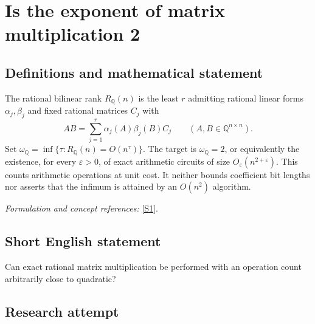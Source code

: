 \documentclass[11pt,a4paper]{article}
\newcommand{\Q}{\mathbb{Q}}
\newcommand{\sref}[2]{\hyperlink{source:#1:#2}{[S#2]}}
\newif\ifshowcatalogue
\newcommand{\cataloguescope}[1]{\ifshowcatalogue
 \paragraph{Exact scope in the supplied catalogue.}
 \begin{quote}\small #1\end{quote}\fi}
\numberwithin{equation}{section}
\begin{document}
\setcounter{section}{0}
\clearpage
\section*{\texorpdfstring{Is the exponent of matrix multiplication 2}{Is the exponent of matrix multiplication 2}}\label{statement}
\subsection{Definitions and mathematical statement}
The rational bilinear rank $R_{\Q}(n)$ is the least $r$ admitting rational linear forms $\alpha_j,\beta_j$ and fixed rational matrices $C_j$ with
\[
 AB=\sum_{j=1}^r\alpha_j(A)\beta_j(B)C_j\qquad(A,B\in\Q^{n\times n}).
\]
Set $\omega_{\Q}=\inf\{\tau:R_{\Q}(n)=O(n^\tau)\}$. The target is $\omega_{\Q}=2$, or equivalently the existence, for every $\varepsilon>0$, of exact arithmetic circuits of size $O_\varepsilon(n^{2+\varepsilon})$. This counts arithmetic operations at unit cost. It neither bounds coefficient bit lengths nor asserts that the infimum is attained by an $O(n^2)$ algorithm.
\par\smallskip\textit{Formulation and concept references:} \sref{statement}{1}.
\cataloguescope{Let R\_Q(n) be the tensor rank over Q of the bilinear map multiplying two n by n rational matrices: the least r for which AB is a sum of r products alpha\_j(A) beta\_j(B) C\_j, with rational linear forms alpha\_j, beta\_j and rational output matrices C\_j. Set omega\_Q = inf\{tau in R : R\_Q(n) = O(n\textasciicircum{}tau)\}. Prove omega\_Q = 2. Equivalently, for every epsilon > 0, exact multiplication admits division-free arithmetic circuits over Q of size O(n\textasciicircum{}(2+epsilon)), counting rational additions, subtractions, multiplications and constant scalar operations at unit cost. Circuits need not be uniformly generated and rational coefficient bit lengths are not charged. Constants and thresholds may depend on epsilon. Literal O(n\textasciicircum{}2) attainment is not required.}
\subsection{Short English statement}
Can exact rational matrix multiplication be performed with an operation count arbitrarily close to quadratic?
\subsection{Research attempt}
\end{document}
